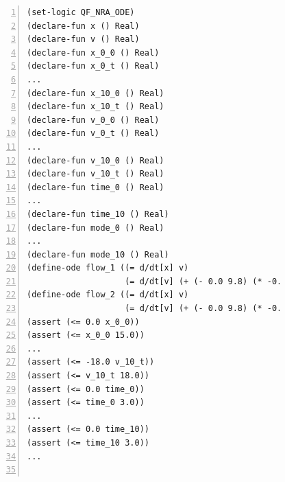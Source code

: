 \begin{figure}
  \centering
  \begin{Verbatim}[fontfamily=courier, frame=single, framesep=1mm,
  numbers=left, fontsize=\scriptsize]
(set-logic QF_NRA_ODE)
(declare-fun x () Real)
(declare-fun v () Real)
(declare-fun x_0_0 () Real)
(declare-fun x_0_t () Real)
...
(declare-fun x_10_0 () Real)
(declare-fun x_10_t () Real)
(declare-fun v_0_0 () Real)
(declare-fun v_0_t () Real)
...
(declare-fun v_10_0 () Real)
(declare-fun v_10_t () Real)
(declare-fun time_0 () Real)
...
(declare-fun time_10 () Real)
(declare-fun mode_0 () Real)
...
(declare-fun mode_10 () Real)
(define-ode flow_1 ((= d/dt[x] v)
                    (= d/dt[v] (+ (- 0.0 9.8) (* -0.45 (^ v 1.0))))))
(define-ode flow_2 ((= d/dt[x] v)
                    (= d/dt[v] (+ (- 0.0 9.8) (* -0.45 (^ v 1.0))))))
(assert (<= 0.0 x_0_0))
(assert (<= x_0_0 15.0))
...
(assert (<= -18.0 v_10_t))
(assert (<= v_10_t 18.0))
(assert (<= 0.0 time_0))
(assert (<= time_0 3.0))
...
(assert (<= 0.0 time_10))
(assert (<= time_10 3.0))
...


\end{Verbatim}
\end{figure}
